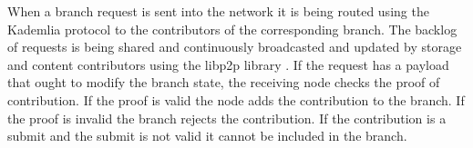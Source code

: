 When a branch request is sent into the network it is being routed using the Kademlia protocol to the contributors of the corresponding branch. The backlog of requests is being shared and continuously broadcasted and updated by storage and content contributors using the libp2p library \cite{}. If the request has a payload that ought to modify the branch state, the receiving node checks the proof of contribution. If the proof is valid the node adds the contribution to the branch. If the proof is invalid the branch rejects the contribution. If the contribution is a submit and the submit is not valid it cannot be included in the branch. 














% 

